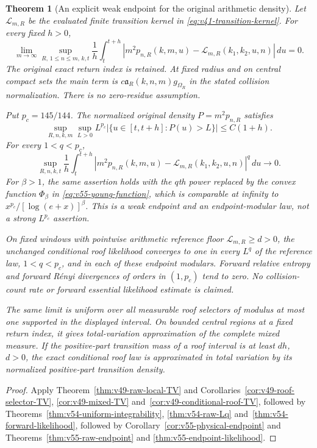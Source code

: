 \documentclass[11pt,reqno]{amsart}
\numberwithin{equation}{section}
\newtheorem{leadtheorem}{Theorem}
\theoremstyle{definition}\newtheorem{definition}[theorem]{Definition}
\theoremstyle{remark}\newtheorem{remark}[theorem]{Remark}
\begin{document}
\begin{leadtheorem}[An explicit weak endpoint for the original arithmetic density]
\label{thm:intro-v49-local-TV}
Let $\mathcal L_{m,R}$ be the evaluated finite transition kernel in
\eqref{eq:v41-transition-kernel}. For every fixed $h>0$,
\[
 \lim_{m\to\infty}\sup_{R,\,1\le n\le m,\,k,t}
 \frac1h\int_t^{t+h}
 |m^2p_{n,R}(k,m,u)-\mathcal L_{m,R}(k_1,k_2,u,n)|\,du=0.
\]
The original exact return index is retained. At fixed radius and on
central compact sets the main term is
$c\mathfrak a_R(k,n,m)g_{\Omega_R}$ in the stated collision
normalization. There is no zero-residue assumption.

Put $p_c=145/144$. The normalized original density $P=m^2p_{n,R}$
satisfies
\[
 \sup_{R,n,k,m}\sup_{L>0} L^{p_c}
    |\{u\in[t,t+h]:P(u)>L\}|\le C(1+h).
\]
For every $1<q<p_c$,
\[
 \sup_{R,n,k,t}\frac1h\int_t^{t+h}
 |m^2p_{n,R}(k,m,u)-\mathcal L_{m,R}(k_1,k_2,u,n)|^q\,du\to0.
\]
For $\beta>1$, the same assertion holds with the $q$th power replaced
by the convex function $\Phi_\beta$ in
\eqref{eq:v55-young-function}, which is comparable at infinity to
$x^{p_c}/[\log(e+x)]^\beta$. This is a weak endpoint and an
endpoint-modular law, not a strong $L^{p_c}$ assertion.

On fixed windows with pointwise arithmetic reference floor
$\mathcal L_{m,R}\ge d>0$, the unchanged conditional roof likelihood
converges to one in every $L^q$ of the reference law, $1<q<p_c$,
and in each of these endpoint modulars. Forward relative entropy
and forward R\'enyi divergences of orders in $(1,p_c)$ tend to zero.
No collision-count rate or forward essential likelihood estimate
is claimed.

The same limit is uniform over all measurable roof selectors of
modulus at most one supported in the displayed interval. On bounded
central regions at a fixed return index, it gives total-variation
approximation of the complete mixed measure. If the positive-part
transition mass of a roof interval is at least $dh$, $d>0$, the exact
conditional roof law is approximated in total variation by its
normalized positive-part transition density.
\end{leadtheorem}
\begin{proof}
Apply Theorem~\ref{thm:v49-raw-local-TV} and
Corollaries~\ref{cor:v49-roof-selector-TV}, \ref{cor:v49-mixed-TV}
and~\ref{cor:v49-conditional-roof-TV}, followed by
Theorems~\ref{thm:v54-uniform-integrability}, \ref{thm:v54-raw-Lq}
and~\ref{thm:v54-forward-likelihood}, followed by
Corollary~\ref{cor:v55-physical-endpoint} and
Theorems~\ref{thm:v55-raw-endpoint} and
\ref{thm:v55-endpoint-likelihood}.
\end{proof}
\end{document}
